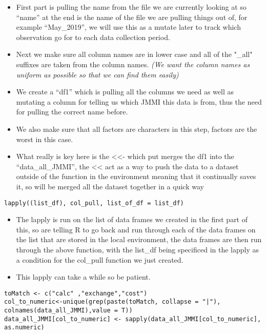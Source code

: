 \documentclass[
]{article}
\providecommand{\tightlist}{%
  \setlength{\itemsep}{0pt}\setlength{\parskip}{0pt}}
\begin{document}
\begin{itemize}
\tightlist
\item
  First part is pulling the name from the file we are currently looking
  at so ``name'' at the end is the name of the file we are pulling
  things out of, for example ``May\_2019'', we will use this as a mutate
  later to track which observation go for to each data collection
  period.
\item
  Next we make sure all column names are in lower case and all of the
  "\_all" suffixes are taken from the column names. \emph{(We want the
  column names as uniform as possible so that we can find them easily)}
\item
  We create a ``df1'' which is pulling all the columns we need as well
  as mutating a column for telling us which JMMI this data is from, thus
  the need for pulling the correct name before.
\item
  We also make sure that all factors are characters in this step,
  factors are the worst in this case.
\item
  What really is key here is the \textless\textless- which put merges
  the df1 into the ``data\_all\_JMMI'', the \textless\textless{} act as
  a way to push the data to a dataset outside of the function in the
  environment meaning that it continually saves it, so will be merged
  all the dataset together in a quick way
\end{itemize}

\begin{verbatim}
lapply((list_df), col_pull, list_of_df = list_df)
\end{verbatim}

\begin{itemize}
\tightlist
\item
  The lapply is run on the list of data frames we created in the first
  part of this, so are telling R to go back and run through each of the
  data frames on the list that are stored in the local environment, the
  data frames are then run through the above function, with the list\_df
  being specificed in the lapply as a condition for the col\_pull
  function we just created.
\item
  This lapply can take a while so be patient.
\end{itemize}

\begin{verbatim}
toMatch <- c("calc" ,"exchange","cost")
col_to_numeric<-unique(grep(paste(toMatch, collapse = "|"), colnames(data_all_JMMI),value = T))
data_all_JMMI[col_to_numeric] <- sapply(data_all_JMMI[col_to_numeric], as.numeric)
\end{verbatim}
\end{document}
